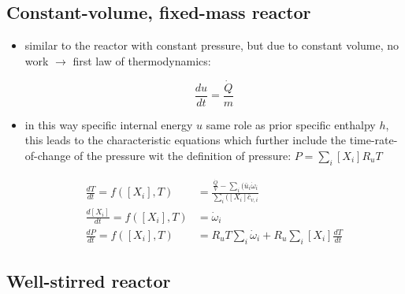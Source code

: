 \documentclass[12pt,oneside,a4paper,english]{article}
\begin{document}
\subsection{Constant-volume, fixed-mass reactor} %

\begin{itemize}
\item{similar to the reactor with constant pressure, but due to constant volume, no work $\rightarrow$ first law of thermodynamics:}

\begin{equation}
\frac{du}{dt}=\frac{\dot{Q}}{m}
\end{equation}

\item{in this way specific internal energy $u$ same role as prior specific enthalpy $h$, this leads to the characteristic equations which further include the time-rate-of-change of the pressure wit the definition of pressure: $P = \sum_i [X_i] R_u T$}

\begin{align}
 \frac{dT}{dt}=f([X_i],T) &= \frac{\frac{\dot{Q}}{V}-\sum_i (\bar{u}_i \dot{\omega}_i}{\sum_i ([X_i] \bar{c}_{v,i}} \\
 \frac{d[X_i]}{dt}=f([X_i],T) &= \dot{\omega}_i \\
 \frac{dP}{dt}=f([X_i],T) &= R_u T \sum_i \dot{\omega}_i + R_u \sum_i [X_i] \frac{dT}{dt}
 \end{align}
 
 \end{itemize}
 
 
\subsection {Well-stirred reactor} %
\end{document}
